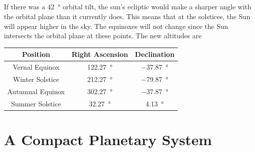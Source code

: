 \documentclass{article}
\begin{document}
\subsection{}

If there was a \SI{42}{\degree} orbital tilt, the sun's ecliptic would make a sharper angle with the orbital plane than it currently does.
This means that at the solstices, the Sun will appear higher in the sky.
The equinoxes will not change since the Sun intersects the orbital plane at these points.
The new altitudes are
\begin{center}
    \begin{tabular}{||c|c|c||}
        \hline
        Position & Right Ascension & Declination \\
        \hline
        Vernal Equinox & \SI{122.27}{\degree} & \SI{-37.87}{\degree} \\
        Winter Solstice & \SI{212.27}{\degree} & \SI{-79.87}{\degree} \\
        Autumnal Equinox & \SI{302.27}{\degree} & \SI{-37.87}{\degree} \\
        Summer Solstice & \SI{32.27}{\degree} & \SI{4.13}{\degree} \\
        \hline
    \end{tabular}
\end{center}

\section{A Compact Planetary System}

\subsection{}
\end{document}
